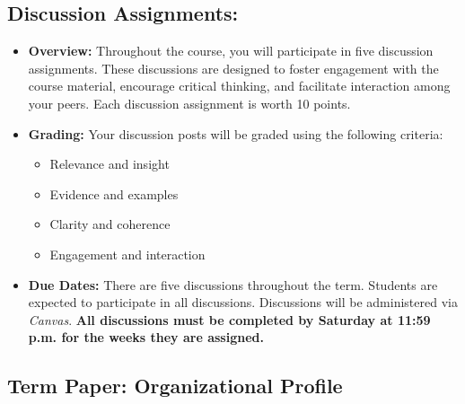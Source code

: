 \documentclass[12pt, letterpaper]{article}
\begin{document}
\subsection*{Discussion Assignments:}
    \begin{itemize}
        \item \textbf{Overview:} Throughout the course, you will participate in five discussion assignments. These discussions are designed to foster engagement with the course material, encourage critical thinking, and facilitate interaction among your peers. Each discussion assignment is worth 10 points.
        \item \textbf{Grading:} Your discussion posts will be graded using the following criteria:
            \begin{itemize}
                \item Relevance and insight
                \item Evidence and examples
                \item Clarity and coherence
                \item Engagement and interaction
            \end{itemize}
        \item \textbf{Due Dates:} There are five discussions throughout the term. Students are expected to participate in all discussions. Discussions will be administered via \emph{Canvas}. \textbf{All discussions must be completed by Saturday at 11:59 p.m. for the weeks they are assigned.}
    \end{itemize}

\subsection*{Term Paper: Organizational Profile}
\end{document}
